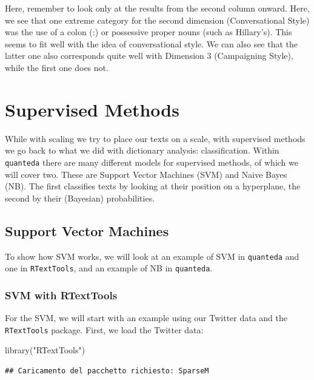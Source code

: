 \documentclass[
]{book}
\newenvironment{Shaded}{\begin{snugshade}}{\end{snugshade}}
\newcommand{\FunctionTok}[1]{\textcolor[rgb]{0.00,0.00,0.00}{#1}}
\newcommand{\NormalTok}[1]{#1}
\newcommand{\StringTok}[1]{\textcolor[rgb]{0.31,0.60,0.02}{#1}}
\begin{document}
Here, remember to look only at the results from the second column onward. Here, we see that one extreme category for the second dimension (Conversational Style) was the use of a colon (:) or possessive proper nouns (such as Hillary's). This seems to fit well with the idea of conversational style. We can also see that the latter one also corresponds quite well with Dimension 3 (Campaigning Style), while the first one does not.

\hypertarget{supervised-methods}{%
\chapter{Supervised Methods}\label{supervised-methods}}

While with scaling we try to place our texts on a scale, with supervised methods we go back to what we did with dictionary analysis: classification. Within \texttt{quanteda} there are many different models for supervised methods, of which we will cover two. These are Support Vector Machines (SVM) and Naive Bayes (NB). The first classifies texts by looking at their position on a hyperplane, the second by their (Bayesian) probabilities.

\hypertarget{support-vector-machines}{%
\section{Support Vector Machines}\label{support-vector-machines}}

To show how SVM works, we will look at an example of SVM in \texttt{quanteda} and one in \texttt{RTextTools}, and an example of NB in \texttt{quanteda}.

\hypertarget{svm-with-rtexttools}{%
\subsection{SVM with RTextTools}\label{svm-with-rtexttools}}

For the SVM, we will start with an example using our Twitter data and the \texttt{RTextTools} package. First, we load the Twitter data:

\begin{Shaded}
\begin{Highlighting}[]
\FunctionTok{library}\NormalTok{(}\StringTok{"RTextTools"}\NormalTok{)}
\end{Highlighting}
\end{Shaded}

\begin{verbatim}
## Caricamento del pacchetto richiesto: SparseM
\end{verbatim}
\end{document}
